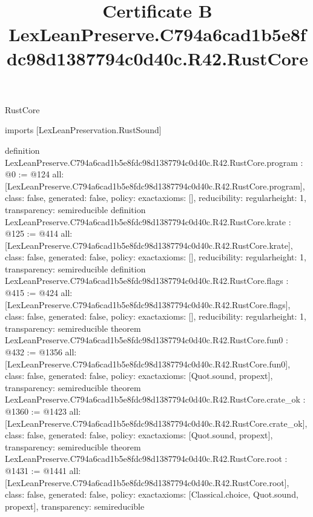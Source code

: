 \begin{lexlean}{RustCore}
\title{Certificate B LexLeanPreserve.C794a6cad1b5e8fdc98d1387794c0d40c.R42.RustCore}
\begin{coremodule}
imports [LexLeanPreservation.RustSound]

definition LexLeanPreserve.C794a6cad1b5e8fdc98d1387794c0d40c.R42.RustCore.program : @0 := @124 {
  all: [LexLeanPreserve.C794a6cad1b5e8fdc98d1387794c0d40c.R42.RustCore.program],
  class: false,
  generated: false,
  policy: exact{axioms: []},
  reducibility: regular{height: 1},
  transparency: semireducible
}
definition LexLeanPreserve.C794a6cad1b5e8fdc98d1387794c0d40c.R42.RustCore.krate : @125 := @414 {
  all: [LexLeanPreserve.C794a6cad1b5e8fdc98d1387794c0d40c.R42.RustCore.krate],
  class: false,
  generated: false,
  policy: exact{axioms: []},
  reducibility: regular{height: 1},
  transparency: semireducible
}
definition LexLeanPreserve.C794a6cad1b5e8fdc98d1387794c0d40c.R42.RustCore.flags : @415 := @424 {
  all: [LexLeanPreserve.C794a6cad1b5e8fdc98d1387794c0d40c.R42.RustCore.flags],
  class: false,
  generated: false,
  policy: exact{axioms: []},
  reducibility: regular{height: 1},
  transparency: semireducible
}
theorem LexLeanPreserve.C794a6cad1b5e8fdc98d1387794c0d40c.R42.RustCore.fun0 : @432 := @1356 {
  all: [LexLeanPreserve.C794a6cad1b5e8fdc98d1387794c0d40c.R42.RustCore.fun0],
  class: false,
  generated: false,
  policy: exact{axioms: [Quot.sound, propext]},
  transparency: semireducible
}
theorem LexLeanPreserve.C794a6cad1b5e8fdc98d1387794c0d40c.R42.RustCore.crate_ok : @1360 := @1423 {
  all: [LexLeanPreserve.C794a6cad1b5e8fdc98d1387794c0d40c.R42.RustCore.crate_ok],
  class: false,
  generated: false,
  policy: exact{axioms: [Quot.sound, propext]},
  transparency: semireducible
}
theorem LexLeanPreserve.C794a6cad1b5e8fdc98d1387794c0d40c.R42.RustCore.root : @1431 := @1441 {
  all: [LexLeanPreserve.C794a6cad1b5e8fdc98d1387794c0d40c.R42.RustCore.root],
  class: false,
  generated: false,
  policy: exact{axioms: [Classical.choice, Quot.sound, propext]},
  transparency: semireducible
}


\end{coremodule}
\end{lexlean}
